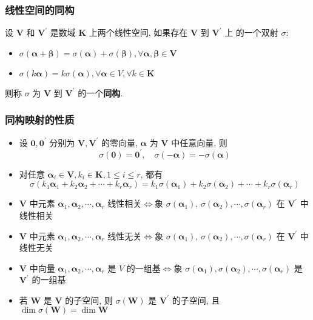 \documentclass{article}
\begin{document}
			\subsubsection{线性空间的同构}
				设 $\boldsymbol V$ 和 $\boldsymbol V^{\prime}$ 是数域 $ \mathbf K$ 上两个线性空间, 如果存在 $\boldsymbol V$ 到 $\boldsymbol V^{\prime}$ 上 的一个双射 $\sigma$:
				\begin{itemize}
					\item $\sigma(\boldsymbol{\alpha}+\boldsymbol{\beta})=\sigma(\boldsymbol{\alpha})+\sigma(\boldsymbol{\beta}), \forall \boldsymbol{\alpha}, \boldsymbol{\beta} \in \boldsymbol V$
					\item $\sigma(k \boldsymbol{\alpha})=k \sigma(\boldsymbol{\alpha}), \forall \boldsymbol{\alpha} \in V, \forall k \in \mathbf K$
				\end{itemize}
				则称 $\sigma$ 为 $\boldsymbol V$ 到 $\boldsymbol V^{\prime}$ 的一个\textbf{同构}.
			\subsubsection{同构映射的性质}
				\begin{itemize}
					\item 设 $\mathbf{0}, \mathbf{0}^{\prime}$ 分别为 $\boldsymbol V, \boldsymbol V^{\prime}$ 的零向量, $\boldsymbol{\alpha}$ 为 $\boldsymbol V$ 中任意向量, 则
					$$
					\sigma(\mathbf{0})=\mathbf{0}^{\prime}, \quad 	\sigma(-\boldsymbol{\alpha})=-\sigma(\boldsymbol{\alpha})
					$$
					\item 对任意 $\boldsymbol{\alpha}_{i} \in \boldsymbol V, k_{i} \in \mathbf K, 1 \leqslant i \leqslant r$, 都有
					$$
					\sigma\left(k_{1} \boldsymbol{\alpha}_{1}+k_{2} \boldsymbol{\alpha}_{2}+\cdots+k_{r} 	\boldsymbol{\alpha}_{r}\right)=k_{1} \sigma\left(\boldsymbol{\alpha}_{1}\right)+k_{2} \sigma\left(\boldsymbol{\alpha}_{2}\right)+\cdots+k_{r} \sigma\left(\boldsymbol{\alpha}_{r}\right)
					$$
					\item $\boldsymbol V$ 中元素 $\boldsymbol{\alpha}_{1}, \boldsymbol{\alpha}_{2}, \cdots, \boldsymbol{\alpha}_{r}$ 线性相关$\Leftrightarrow$象 $\sigma\left(\boldsymbol{\alpha}_{1}\right)$, $\sigma\left(\boldsymbol{\alpha}_{2}\right), \cdots, \sigma\left(\boldsymbol{\alpha}_{r}\right)$ 在 $\boldsymbol V^{\prime}$ 中线性相关
					\item $\boldsymbol V$ 中元素 $\boldsymbol{\alpha}_{1}, \boldsymbol{\alpha}_{2}, \cdots, \boldsymbol{\alpha}_{r}$ 线性无关$\Leftrightarrow$象 $\sigma\left(\boldsymbol{\alpha}_{1}\right)$, $\sigma\left(\boldsymbol{\alpha}_{2}\right), \cdots, \sigma\left(\boldsymbol{\alpha}_{r}\right)$ 在 $\boldsymbol V^{\prime}$ 中线性无关
					\item $\boldsymbol V$ 中向量 $\boldsymbol{\alpha}_{1}, \boldsymbol{\alpha}_{2}, \cdots, \boldsymbol{\alpha}_{r}$ 是 $V$ 的一组基$\Leftrightarrow$象 $\sigma\left(\boldsymbol{\alpha}_{1}\right), \sigma\left(\boldsymbol{\alpha}_{2}\right), \cdots, \sigma\left(\boldsymbol{\alpha}_{r}\right)$ 是 $\boldsymbol V^{\prime}$ 的一组基
					\item 若 $\boldsymbol W$ 是 $\boldsymbol V$ 的子空间, 则 $\sigma(\boldsymbol W)$ 是 $\boldsymbol V^{\prime}$ 的子空间, 且 $\operatorname{dim} \sigma(\boldsymbol W)=\operatorname{dim} \boldsymbol W$
				\end{itemize}
\end{document}
